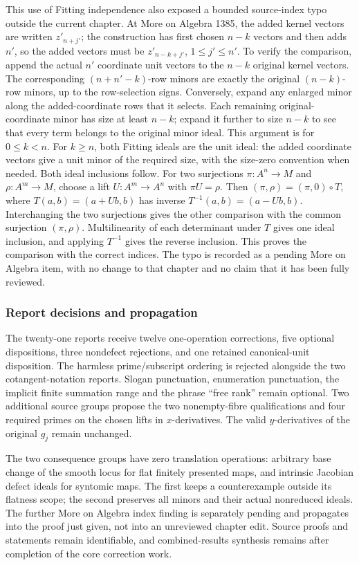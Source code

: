 This use of Fitting independence also exposed a bounded source-index typo outside the current chapter. At More on Algebra 1385, the added kernel vectors are written \(z'_{n+j'}\); the construction has first chosen \(n-k\) vectors and then adds \(n'\), so the added vectors must be \(z'_{n-k+j'}\), \(1\le j'\le n'\). To verify the comparison, append the actual \(n'\) coordinate unit vectors to the \(n-k\) original kernel vectors. The corresponding \((n+n'-k)\)-row minors are exactly the original \((n-k)\)-row minors, up to the row-selection signs. Conversely, expand any enlarged minor along the added-coordinate rows that it selects. Each remaining original-coordinate minor has size at least \(n-k\); expand it further to size \(n-k\) to see that every term belongs to the original minor ideal. This argument is for \(0\le k<n\). For \(k\ge n\), both Fitting ideals are the unit ideal: the added coordinate vectors give a unit minor of the required size, with the size-zero convention when needed. Both ideal inclusions follow. For two surjections \(\pi:A^n\to M\) and \(\rho:A^m\to M\), choose a lift \(U:A^m\to A^n\) with \(\pi U=\rho\). Then \((\pi,\rho)=(\pi,0)\circ T\), where \(T(a,b)=(a+Ub,b)\) has inverse \(T^{-1}(a,b)=(a-Ub,b)\). Interchanging the two surjections gives the other comparison with the common surjection \((\pi,\rho)\). Multilinearity of each determinant under \(T\) gives one ideal inclusion, and applying \(T^{-1}\) gives the reverse inclusion. This proves the comparison with the correct indices. The typo is recorded as a pending More on Algebra item, with no change to that chapter and no claim that it has been fully reviewed.

\subsubsection{Report decisions and propagation}\label{algebra-proof-047-report-decisions-and-propagation}

The twenty-one reports receive twelve one-operation corrections, five optional dispositions, three nondefect rejections, and one retained canonical-unit disposition. The harmless prime/subscript ordering is rejected alongside the two cotangent-notation reports. Slogan punctuation, enumeration punctuation, the implicit finite summation range and the phrase ``free rank'' remain optional. Two additional source groups propose the two nonempty-fibre qualifications and four required primes on the chosen lifts in \(x\)-derivatives. The valid \(y\)-derivatives of the original \(g_j\) remain unchanged.

The two consequence groups have zero translation operations: arbitrary base change of the smooth locus for flat finitely presented maps, and intrinsic Jacobian defect ideals for syntomic maps. The first keeps a counterexample outside its flatness scope; the second preserves all minors and their actual nonreduced ideals. The further More on Algebra index finding is separately pending and propagates into the proof just given, not into an unreviewed chapter edit. Source proofs and statements remain identifiable, and combined-results synthesis remains after completion of the core correction work.
